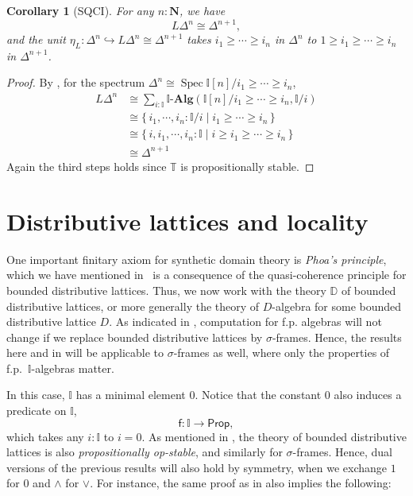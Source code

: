 \documentclass[a4paper,12pt]{amsart}
\newtheorem{corollary}[theorem]{Corollary}
\theoremstyle{definition}
\newcommand{\mb}[1]{\mathbf{#1}}
\newcommand{\mbb}[1]{\mathbb{#1}}
\newcommand{\T}{\mbb T}
\newcommand{\I}{\mbb I}
\newcommand{\ms}[1]{\mathsf{#1}}
\newcommand{\alg}{\text{-}\mb{Alg}}
\newcommand{\scomp}[2]{\{\,#1\mid#2\,\}}
\newcommand{\hook}{\hookrightarrow}
\newcommand{\N}{\mb N}
\newcommand{\pp}{\ms{Prop}}
\newcommand{\spec}{\operatorname{Spec}}
\begin{document}
\begin{corollary}[SQCI]
  For any $n : \N$, we have
  \[ L\Delta^n \cong \Delta^{n+1}, \]
  and the unit $\eta_L \colon \Delta^n \hook L\Delta^n \cong \Delta^{n+1}$ takes $i_1 \ge \cdots \ge i_n$ in $\Delta^n$ to $1 \ge i_1 \ge \cdots \ge i_n$ in $\Delta^{n+1}$. 
\end{corollary}
\begin{proof}
  By , for the spectrum $\Delta^n \cong \spec\I[n]/i_1 \ge \cdots \ge i_n$,
  \begin{align*}
    L\Delta^n
    &\cong \sum_{i:\I}\I\alg(\I[n]/i_1\ge\cdots\ge i_n,\I/i) \\
    &\cong \scomp{i_1,\cdots,i_n:\I/i}{i_1 \ge \cdots \ge i_n} \\
    &\cong \scomp{i,i_1,\cdots,i_n:\I}{i \ge i_1 \ge \cdots \ge i_n} \\
    &\cong \Delta^{n+1}
  \end{align*}
  Again the third steps holds since $\T$ is propositionally stable.
\end{proof}

\section{Distributive lattices and locality}\label{sec:locality}

One important finitary axiom for synthetic domain theory is \emph{Phoa's principle}, which we have mentioned in~ is a consequence of the quasi-coherence principle for bounded distributive lattices. 
Thus, we now work with the theory $\mbb D$ of bounded distributive lattices, or more generally the theory of $D$-algebra for some bounded distributive lattice $D$. As indicated in , computation for f.p. algebras 
will not change if we replace bounded distributive lattices by $\sigma$-frames. Hence, the results here and in  will be applicable to $\sigma$-frames as well, where only the properties of f.p.\ $\I$-algebras matter.

In this case, $\I$ has a minimal element $0$. Notice that the constant $0$ also induces a predicate on $\I$,
\[ \ms f \colon \I \to \pp, \]
which takes any $i : \I$ to $i = 0$. As mentioned in , the theory of bounded distributive lattices is also \emph{propositionally op-stable}, and similarly for $\sigma$-frames. 
Hence, dual versions of the previous results will also hold by symmetry, when we exchange $1$ for $0$ and $\wedge$ for $\vee$. For instance, the same proof as in  also implies the following:
\end{document}
